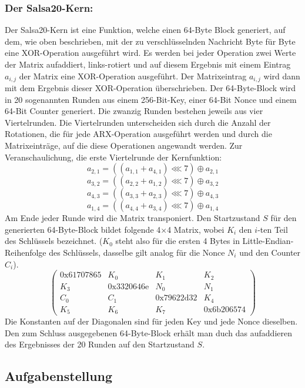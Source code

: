 \documentclass[course=erap]{aspdoc}
\begin{document}
\subsubsection{Der Salsa20-Kern:}
Der Salsa20-Kern ist eine Funktion, welche einen 64-Byte Block generiert, auf dem, wie oben beschrieben, mit 
der zu verschlüsselnden Nachricht Byte für Byte eine XOR-Operation ausgeführt wird. Es werden bei jeder Operation 
zwei Werte der Matrix aufaddiert, links-rotiert und auf diesem Ergebnis mit einem Eintrag $a_{i,j}$ der Matrix eine XOR-Operation ausgeführt.
Der Matrixeintrag $a_{i,j}$ wird dann mit dem Ergebnis dieser XOR-Operation überschrieben.
Der 64-Byte-Block wird in 20 sogenannten Runden aus einem 256-Bit-Key, einer 64-Bit Nonce und einem 64-Bit 
Counter generiert. Die zwanzig Runden bestehen jeweils aus vier Viertelrunden. Die Viertelrunden unterscheiden sich 
durch die Anzahl der Rotationen, die für jede ARX-Operation ausgeführt werden und durch die Matrixeinträge, auf die 
diese Operationen angewandt werden. 
Zur Veranschaulichung, die erste Viertelrunde der Kernfunktion:
\[a_{2,1} = ((a_{1,1} + a_{4,1}) \lll 7) \oplus a_{2,1}\]
\[a_{3,2} = ((a_{2,2} + a_{1,2}) \lll 7) \oplus a_{3,2}\] 
\[a_{4,3} = ((a_{3,3} + a_{2,3}) \lll 7) \oplus a_{4,3}\] 
\[a_{1,4} = ((a_{4,4} + a_{3,4}) \lll 7) \oplus a_{1,4}\]
Am Ende jeder Runde wird die Matrix transponiert.
Den Startzustand $S$ für den generierten 64-Byte-Block bildet folgende 4$\times$4 Matrix, wobei $K_i$ den $i$-ten Teil
des Schlüssels bezeichnet. ($K_0$ steht also für die ersten 4 Bytes in Little-Endian-Reihenfolge des Schlüssels, dasselbe gilt analog für die
Nonce $N_i$ und den Counter $C_i$).
\[
    \begin{pmatrix}
    0\text{x}61707865 & K_0 & K_1 & K_2\\
    K_3 & 0\text{x}3320646\text{e} & N_0 & N_1\\
    C_0 & C_1 & 0\text{x}79622\text{d}32 & K_4\\
    K_5 & K_6 & K_7 & 0\text{x}6\text{b}206574
    \end{pmatrix}
\]
Die Konstanten auf der Diagonalen sind für jeden Key und jede Nonce dieselben.
Den zum Schluss ausgegebenen 64-Byte-Block erhält man duch das aufaddieren des 
Ergebnisses der 20 Runden auf den Startzustand $S$.

\subsection{Aufgabenstellung}
\end{document}
